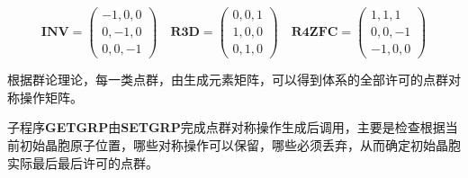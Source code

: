 \documentclass{article}      %
\begin{document}
\begin{itemize}
\begin{displaymath}
	\mathbf{INV}=
	\begin{pmatrix}
		-1, 0, 0 \\ 
		0,-1, 0 \\
		0, 0, -1
	\end{pmatrix}\quad
	\mathbf{R3D}=
	\begin{pmatrix}
		0, 0, 1 \\ 
		1, 0, 0 \\
		0, 1, 0
	\end{pmatrix}\quad
	\mathbf{R4ZFC}=
	\begin{pmatrix}
		1, 1, 1 \\ 
		0, 0, -1 \\
		-1, 0, 0
	\end{pmatrix}
\end{displaymath}
\end{itemize}
根据群论理论，每一类点群，由生成元素矩阵，可以得到体系的全部许可的点群对称操作矩阵。

子程序\textbf{GETGRP}由\textbf{SETGRP}完成点群对称操作生成后调用，主要是检查根据当前初始晶胞原子位置，哪些对称操作可以保留，哪些必须丢弃，从而确定初始晶胞实际最后最后许可的点群。
\end{document}
